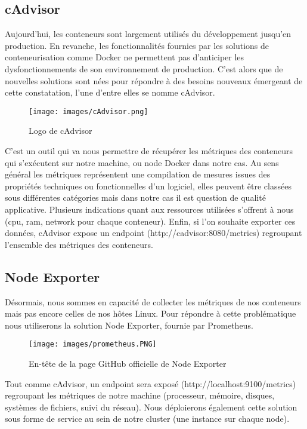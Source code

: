 \documentclass[oneside,12pt]{report}
\begin{document}
\subsection{cAdvisor}

Aujourd'hui, les conteneurs sont largement utilisés du développement jusqu'en production. En revanche, les fonctionnalités fournies par les solutions de conteneurisation comme Docker ne permettent pas d'anticiper les dysfonctionnements de son environnement de production. C'est alors que de nouvelles solutions sont nées pour répondre à des besoins nouveaux émergeant de cette constatation, l'une d'entre elles se nomme cAdvisor.

\begin{figure}[!ht]
    \centering
    \texttt{[image: images/cAdvisor.png]}
    \caption{Logo de cAdvisor}
    \label{fig:mesh1}
\end{figure}

C'est un outil qui va nous permettre de récupérer les métriques des conteneurs qui s'exécutent sur notre machine, ou node Docker dans notre cas. Au sens général les métriques représentent une compilation de mesures issues des propriétés techniques ou fonctionnelles d'un logiciel, elles peuvent être classées sous différentes catégories mais dans notre cas il est question de qualité applicative. Plusieurs indications quant aux ressources utilisées s'offrent à nous (cpu, ram, network pour chaque conteneur). Enfin, si l'on souhaite exporter ces données, cAdvisor expose un endpoint (http://cadvisor:8080/metrics) regroupant l'ensemble des métriques des conteneurs.

\subsection{Node Exporter}

Désormais, nous sommes en capacité de collecter les métriques de nos conteneurs mais pas encore celles de nos hôtes Linux. Pour répondre à cette problématique nous utiliserons la solution Node Exporter, fournie par Prometheus.

\begin{figure}[!ht]
    \centering
    \texttt{[image: images/prometheus.PNG]}
    \caption{En-tête de la page GitHub officielle de Node Exporter}
    \label{fig:mesh1}
\end{figure}

Tout comme cAdvisor, un endpoint sera exposé (http://localhost:9100/metrics) regroupant les métriques de notre machine (processeur, mémoire, disques, systèmes de fichiers, suivi du réseau). Nous déploierons également cette solution sous forme de service au sein de notre cluster (une instance sur chaque node).
\end{document}
